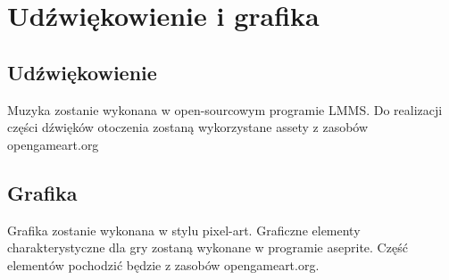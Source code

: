 \documentclass[22pt]{article}
\begin{document}
\section{Udźwiękowienie i grafika}
\subsection{Udźwiękowienie}
Muzyka zostanie wykonana w open-sourcowym programie LMMS. Do realizacji części 
dźwięków otoczenia zostaną wykorzystane assety z zasobów opengameart.org
\subsection{Grafika}
Grafika zostanie wykonana w stylu pixel-art.
Graficzne elementy charakterystyczne dla gry zostaną wykonane w programie
aseprite. Część elementów pochodzić będzie z zasobów opengameart.org.
\end{document}
